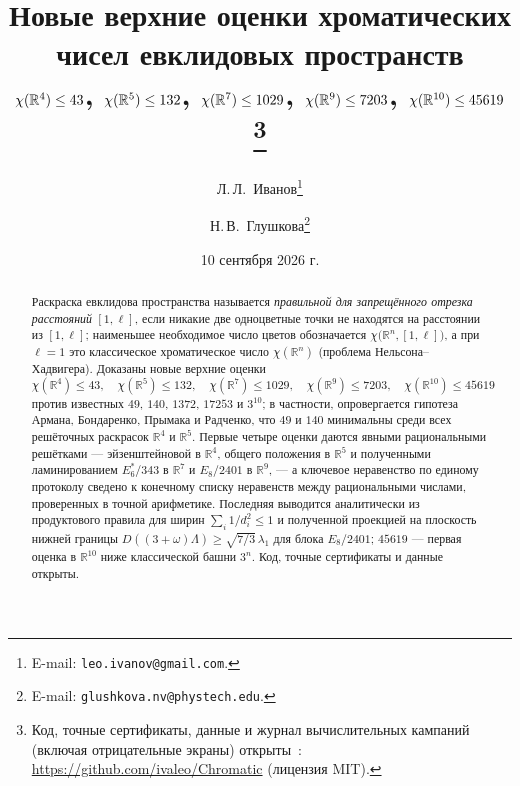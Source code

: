 \documentclass[11pt]{article}
\title{\bfseries Новые верхние оценки хроматических чисел
евклидовых пространств\\[2pt]
\large $\chi(\R^4)\le43$,\; $\chi(\R^5)\le132$,\; $\chi(\R^7)\le1029$,\;
$\chi(\R^9)\le7203$,\; $\chi(\R^{10})\le45619$%
\thanks{Код, точные сертификаты, данные и журнал вычислительных кампаний
(включая отрицательные экраны) открыты~\cite{Repo}:
\url{https://github.com/ivaleo/Chromatic} (лицензия MIT).}}
\author{Л.\,Л.~Иванов\thanks{E-mail: \texttt{leo.ivanov@gmail.com}.}
  \and Н.\,В.~Глушкова\thanks{E-mail: \texttt{glushkova.nv@phystech.edu}.}}
\date{10 сентября 2026 г.}
\theoremstyle{definition}
\theoremstyle{remark}
\newcommand{\R}{\mathbb{R}}
\begin{document}
\maketitle

\begin{abstract}
\noindent
Раскраска евклидова пространства называется \emph{правильной для запрещённого
отрезка расстояний} $[1,\ell]$, если никакие две одноцветные точки не находятся
на расстоянии из $[1,\ell]$; наименьшее необходимое число цветов обозначается
$\chi\bigl(\R^n,[1,\ell]\bigr)$, а при $\ell=1$ это классическое хроматическое
число $\chi(\R^n)$ (проблема Нельсона--Хадвигера). Доказаны новые верхние
оценки
\[
\chi(\R^4)\le43,\quad \chi(\R^5)\le132,\quad \chi(\R^7)\le1029,\quad
\chi(\R^9)\le7203,\quad \chi(\R^{10})\le45619
\]
против известных $49$, $140$, $1372$, $17253$ и $3^{10}$; в частности,
опровергается гипотеза Армана, Бондаренко, Прымака и Радченко, что $49$ и
$140$ минимальны среди всех решёточных раскрасок $\R^4$ и $\R^5$. Первые
четыре оценки даются явными рациональными решётками --- эйзенштейновой в
$\R^4$, общего положения в $\R^5$ и полученными ламинированием $E_6^*/343$ в
$\R^7$ и $E_8/2401$ в $\R^9$, --- а ключевое неравенство по единому протоколу
сведено к конечному списку неравенств между рациональными числами,
проверенных в точной арифметике. Последняя выводится аналитически из
продуктового правила для ширин $\sum_i1/d_i^2\le1$ и полученной проекцией на плоскость нижней границы
$D((3+\omega)\Lambda)\ge\sqrt{7/3}\,\lambda_1$ для блока $E_8/2401$;
$45619$ --- первая оценка в $\R^{10}$ ниже классической башни $3^n$.
Код, точные сертификаты и данные открыты.
\end{abstract}
\end{document}
